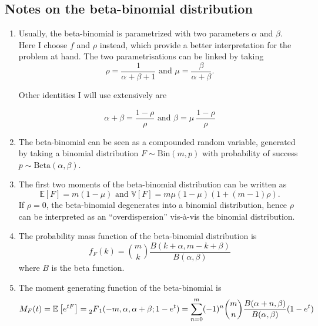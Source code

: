 \documentclass[american, abstract=on]{scrartcl}
\theoremstyle{plain}
\newcommand{\E}{\mathbb{E}}
\newcommand{\V}{\mathbb{V}}
\newcommand{\Beta}{\text{Beta}}
\newcommand{\Bin}{\text{Bin}}
\begin{document}
\subsection{Notes on the beta-binomial distribution}

\begin{enumerate}
    \item Usually, the beta-binomial is parametrized with two parameters $\alpha$ and $\beta$. Here I choose $f$ and $\rho$ instead, which provide a better interpretation for the problem at hand. The two parametrisations can be linked by taking \begin{equation}
        \rho = \frac{1}{\alpha + \beta + 1} \text{ and } \mu = \frac{\beta}{\alpha + \beta}.
    \end{equation}

    Other identities I will use extensively are

    \begin{equation}
        \alpha + \beta = \frac{1-\rho}{\rho} \text{ and } \beta = \mu \ \frac{1-\rho}{\rho}
    \end{equation}

    \item The beta-binomial can be seen as a compounded random variable, generated by taking a binomial distribution $F \sim \Bin(m, p)$ with probability of success $p \sim \Beta(\alpha, \beta)$.
    \item The first two moments of the beta-binomial distribution can be written as \begin{equation}
        \E[F] = m (1 - \mu) \text{ and } \V[F] = m \mu (1 - \mu) (1 + (m - 1) \rho).
    \end{equation} If $\rho = 0$, the beta-binomial degenerates into a binomial distribution, hence $\rho$ can be interpreted as an ``overdispersion'' vis-à-vis the binomial distribution.
    \item The probability mass function of the beta-binomial distribution is \begin{equation} \label{eq:pmf_betabinomial}
        f_F(k) = \binom{m}{k} \frac{B(k + \alpha, m - k + \beta)}{B(\alpha, \beta)}
    \end{equation} where $B$ is the beta function. 
    \item The moment generating function of the beta-binomial is \begin{equation} \label{eq:mgf_betabinomial}
        M_F(t) = \E\left[ e^{tF} \right] = \prescript{}{2}{F}_1(-m, \alpha, \alpha + \beta; 1 - e^{t}) = \sum^m_{n = 0} (-1)^n \binom{m}{n} \frac{B(\alpha + n, \beta)}{B(\alpha, \beta)} (1 - e^t)
    \end{equation}
\end{enumerate}
\end{document}
